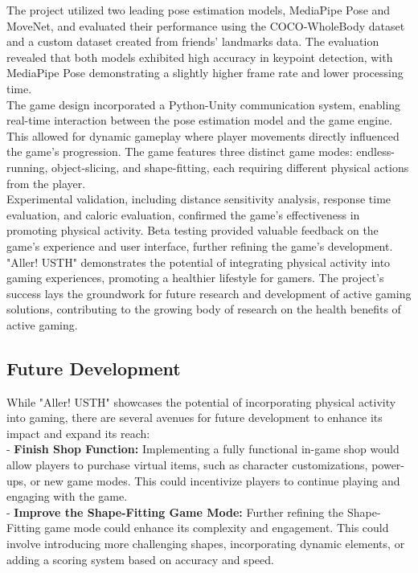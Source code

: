 \documentclass[12pt]{article}
\begin{document}
The project utilized two leading pose estimation models, MediaPipe Pose and MoveNet, and evaluated their performance using the COCO-WholeBody dataset and a custom dataset created from friends' landmarks data. The evaluation revealed that both models exhibited high accuracy in keypoint detection, with MediaPipe Pose demonstrating a slightly higher frame rate and lower processing time.\\

The game design incorporated a Python-Unity communication system, enabling real-time interaction between the pose estimation model and the game engine. This allowed for dynamic gameplay where player movements directly influenced the game's progression. The game features three distinct game modes: endless-running, object-slicing, and shape-fitting, each requiring different physical actions from the player.\\

Experimental validation, including distance sensitivity analysis, response time evaluation, and caloric evaluation, confirmed the game's effectiveness in promoting physical activity. Beta testing provided valuable feedback on the game's experience and user interface, further refining the game's development.\\

"Aller! USTH" demonstrates the potential of integrating physical activity into gaming experiences, promoting a healthier lifestyle for gamers. The project's success lays the groundwork for future research and development of active gaming solutions, contributing to the growing body of research on the health benefits of active gaming.
\clearpage
\subsection{Future Development}
\hspace*{1.5em}While "Aller! USTH" showcases the potential of incorporating physical activity into gaming, there are several avenues for future development to enhance its impact and expand its reach:\\

- \textbf{Finish Shop Function:} Implementing a fully functional in-game shop would allow players to purchase virtual items, such as character customizations, power-ups, or new game modes. This could incentivize players to continue playing and engaging with the game.\\

- \textbf{Improve the Shape-Fitting Game Mode:} Further refining the Shape-Fitting game mode could enhance its complexity and engagement. This could involve introducing more challenging shapes, incorporating dynamic elements, or adding a scoring system based on accuracy and speed.\\
\end{document}
